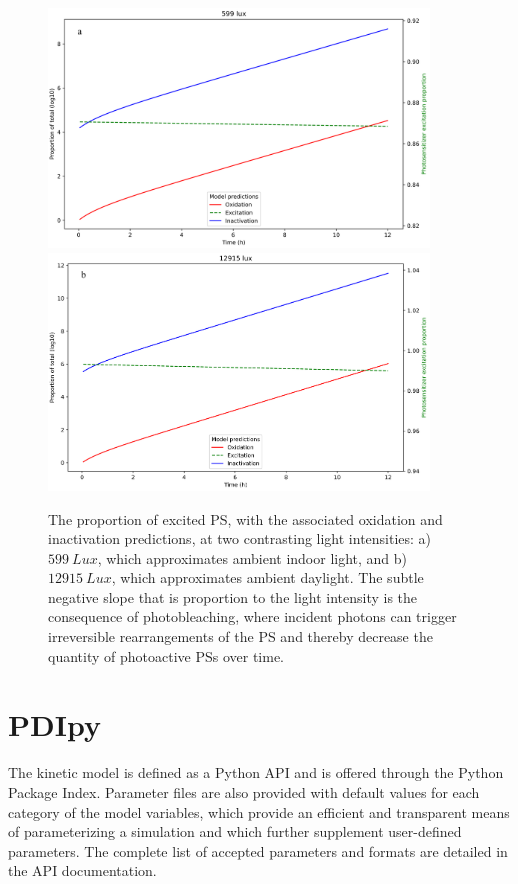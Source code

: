 \begin{figure}
    \centering
    \includegraphics[width = 0.9\textwidth]{images/PDIpy/sensitivity_analyses/light_intensity/599_lux.png} \\
    \vspace{5mm}
    \midrule
    \vspace{5mm}
    \includegraphics[width = 0.9\textwidth]{images/PDIpy/sensitivity_analyses/light_intensity/12915_lux.png}
    \caption{
        The proportion of excited PS, with the associated oxidation and inactivation predictions, at two contrasting light intensities: a) $599~Lux$, which approximates ambient indoor light, and b) $12915~Lux$, which approximates ambient daylight. The subtle negative slope that is proportion to the light intensity is the consequence of photobleaching, where incident photons can trigger irreversible rearrangements of the PS and thereby decrease the quantity of photoactive PSs over time.
    }
    \label{light_intensities}
\end{figure}

\section*{PDIpy}
The kinetic model is defined as a Python API and is offered through the Python Package Index. Parameter files are also provided with default values for each category of the model variables, which provide an efficient and transparent means of parameterizing a simulation and which further supplement user-defined parameters. The complete list of accepted parameters and formats are detailed in the API documentation.

